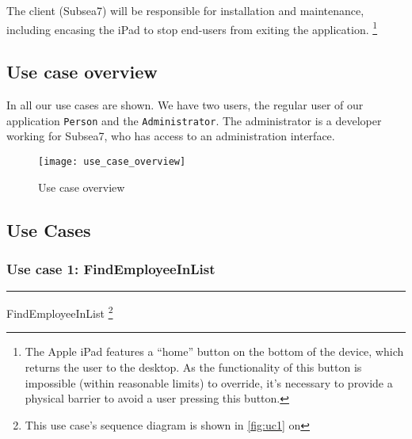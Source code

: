 The client (Subsea7) will be responsible for installation and
maintenance, including encasing the iPad to stop end-users from
exiting the application. \footnote{The Apple iPad features a ``home''
  button on the bottom of the device, which returns the user to the
  desktop.  As the functionality of this button is impossible (within
  reasonable limits) to override, it's necessary to provide a physical
  barrier to avoid a user pressing this button.}

\subsection{Use case overview}

In  all our use cases are shown. We have two
users, the regular user of our application \texttt{Person} and the
\texttt{Administrator}. The administrator is a developer working for
Subsea7, who has access to an administration interface.

\begin{figure}[!h]
    \centerline{\texttt{[image: use\_case\_overview]}}
    \caption{Use case overview}
    \label{fig:ucoverview}
\end{figure}

\clearpage

%
%
\newcommand{\usecaseline}{\vspace*{-6pt} \noindent
  \rule[0.5ex]{1\columnwidth}{1pt} \vspace*{-16pt}}
\newcommand{\usecasethickline}{\vspace*{-6pt} \noindent
  \rule[0.5ex]{1\columnwidth}{1.5pt} \vspace*{-16pt}}

\subsection{Use Cases} \label{sec:usecases}

\subsubsection{Use case 1: FindEmployeeInList}

\usecasethickline

\begin{description}[style=multiline,leftmargin=4cm,font=\normalfont]
\item[\emph{Use case name:}] FindEmployeeInList \footnote{This use
    case's sequence diagram is shown in \autoref{fig:uc1} on
    }
\end{description}

